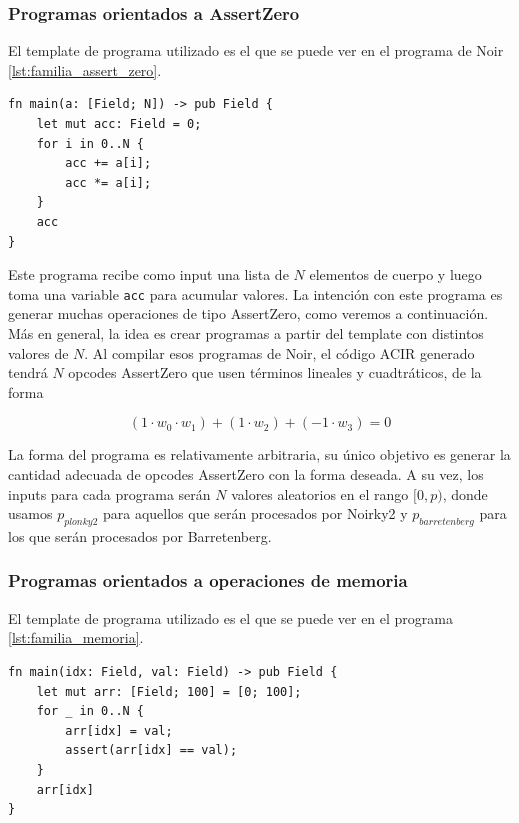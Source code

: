 \documentclass[11pt,a4paper]{tesis}
\begin{document}
\subsubsection{\textbf{Programas orientados a AssertZero}}
El template de programa utilizado es el que se puede ver en el programa de Noir \ref{lst:familia_assert_zero}.
\begin{center}
\begin{minipage}{0.6\textwidth}
\begin{verbatim}
fn main(a: [Field; N]) -> pub Field {
    let mut acc: Field = 0;
    for i in 0..N {
        acc += a[i];
        acc *= a[i];
    }
    acc
}
\end{verbatim}
\label{lst:familia_assert_zero}
\end{minipage}
\end{center}

Este programa recibe como input una lista de $N$ elementos de cuerpo y luego toma una variable \texttt{acc} para acumular valores. La intención con este programa es generar muchas operaciones de tipo AssertZero, como veremos a continuación. Más en general, la idea es crear programas a partir del template con distintos valores de $N$. Al compilar esos programas de Noir, el código ACIR generado tendrá $N$ opcodes AssertZero que usen términos lineales y cuadtráticos, de la forma 

$$(1 \cdot w_0 \cdot w_1) + (1 \cdot w_2) + (-1 \cdot w_3) = 0 $$

La forma del programa es relativamente arbitraria, su único objetivo es generar la cantidad adecuada de opcodes AssertZero con la forma deseada. A su vez, los inputs para cada programa serán $N$ valores aleatorios en el rango $[0,p)$, donde usamos $p_{plonky2}$ para aquellos que serán procesados por Noirky2 y $p_{barretenberg}$ para los que serán procesados por Barretenberg. 

\subsubsection{\textbf{Programas orientados a operaciones de memoria}}
El template de programa utilizado es el que se puede ver en el programa \ref{lst:familia_memoria}. 

\begin{listing}[H]
\caption{Familia de programas orientada a operaciones de memoria, variando cantidad de iteraciones}
\label{lst:familia_memoria}
\begin{verbatim}
fn main(idx: Field, val: Field) -> pub Field {
    let mut arr: [Field; 100] = [0; 100];
    for _ in 0..N {
        arr[idx] = val;
        assert(arr[idx] == val);
    }
    arr[idx]
}
\end{verbatim}
\end{listing}
\end{document}
